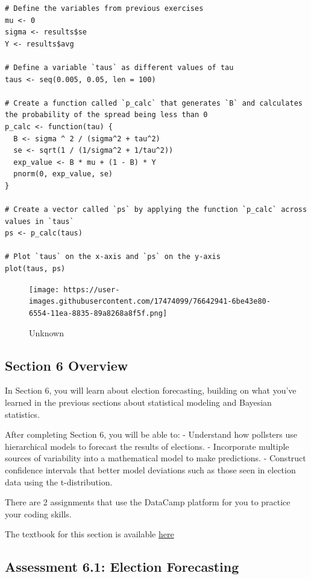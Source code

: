 \documentclass[
]{article}
\begin{document}
\begin{verbatim}
# Define the variables from previous exercises
mu <- 0
sigma <- results$se
Y <- results$avg

# Define a variable `taus` as different values of tau
taus <- seq(0.005, 0.05, len = 100)

# Create a function called `p_calc` that generates `B` and calculates the probability of the spread being less than 0
p_calc <- function(tau) {
  B <- sigma ^ 2 / (sigma^2 + tau^2)
  se <- sqrt(1 / (1/sigma^2 + 1/tau^2))
  exp_value <- B * mu + (1 - B) * Y
  pnorm(0, exp_value, se)
}

# Create a vector called `ps` by applying the function `p_calc` across values in `taus`
ps <- p_calc(taus)

# Plot `taus` on the x-axis and `ps` on the y-axis
plot(taus, ps)
\end{verbatim}

\begin{figure}
\centering
\texttt{[image: https://user-images.githubusercontent.com/17474099/76642941-6be43e80-6554-11ea-8835-89a8268a8f5f.png]}
\caption{Unknown}
\end{figure}

\hypertarget{section-6-overview}{%
\subsection{Section 6 Overview}\label{section-6-overview}}

In Section 6, you will learn about election forecasting, building on
what you've learned in the previous sections about statistical modeling
and Bayesian statistics.

After completing Section 6, you will be able to: - Understand how
pollsters use hierarchical models to forecast the results of elections.
- Incorporate multiple sources of variability into a mathematical model
to make predictions. - Construct confidence intervals that better model
deviations such as those seen in election data using the t-distribution.

There are 2 assignments that use the DataCamp platform for you to
practice your coding skills.

The textbook for this section is available
\href{https://rafalab.github.io/dsbook/models.html\#election-forecasting}{here}

\hypertarget{assessment-6.1-election-forecasting}{%
\subsection{Assessment 6.1: Election
Forecasting}\label{assessment-6.1-election-forecasting}}
\end{document}

